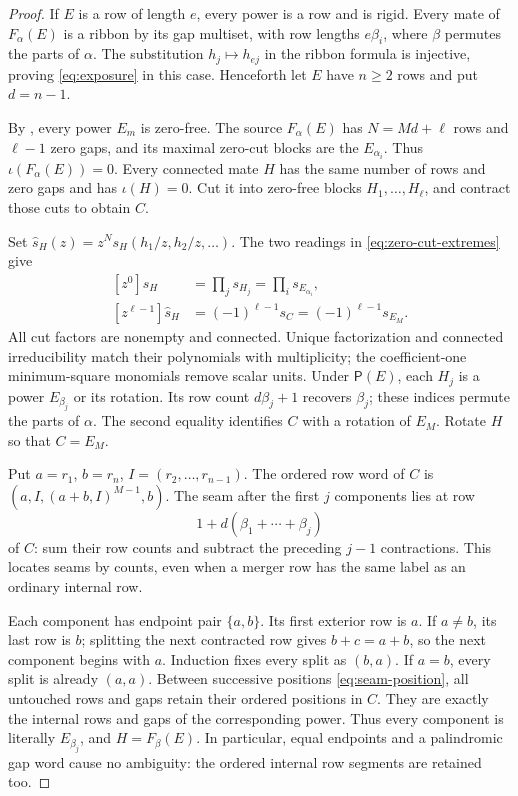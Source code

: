 \documentclass[11pt,a4paper]{amsart}
\numberwithin{equation}{section}
\theoremstyle{plain}
\theoremstyle{definition}
\begin{document}
\begin{proof}
If \(E\) is a row of length \(e\), every power is a row and is rigid.  Every mate of \(F_\alpha(E)\) is a ribbon by its gap multiset, with row lengths \(e\beta_i\), where \(\beta\) permutes the parts of \(\alpha\).  The substitution \(h_j\mapsto h_{ej}\) in the ribbon formula is injective, proving \eqref{eq:exposure} in this case.  Henceforth let \(E\) have \(n\ge2\) rows and put \(d=n-1\).

By , every power \(E_m\) is zero-free.  The source \(F_\alpha(E)\) has \(N=Md+\ell\) rows and \(\ell-1\) zero gaps, and its maximal zero-cut blocks are the \(E_{\alpha_i}\).  Thus \(\iota(F_\alpha(E))=0\).  Every connected mate \(H\) has the same number of rows and zero gaps and has \(\iota(H)=0\).  Cut it into zero-free blocks \(H_1,\ldots,H_\ell\), and contract those cuts to obtain \(C\).

Set \(\widehat s_H(z)=z^Ns_H(h_1/z,h_2/z,\ldots)\).  The two readings in \eqref{eq:zero-cut-extremes} give
\begin{equation}\label{eq:exposure-coefficients}
 \begin{aligned}
 [z^0]\widehat s_H&=\prod_j s_{H_j}=\prod_i s_{E_{\alpha_i}},\\
 [z^{\ell-1}]\widehat s_H&=(-1)^{\ell-1}s_C
                         =(-1)^{\ell-1}s_{E_M}.
 \end{aligned}
\end{equation}
All cut factors are nonempty and connected.  Unique factorization and connected irreducibility match their polynomials with multiplicity; the coefficient-one minimum-square monomials remove scalar units.  Under \(\mathsf P(E)\), each \(H_j\) is a power \(E_{\beta_j}\) or its rotation.  Its row count \(d\beta_j+1\) recovers \(\beta_j\); these indices permute the parts of \(\alpha\).  The second equality identifies \(C\) with a rotation of \(E_M\).  Rotate \(H\) so that \(C=E_M\).

Put \(a=r_1\), \(b=r_n\), \(I=(r_2,\ldots,r_{n-1})\).  The ordered row word of \(C\) is \((a,I,(a+b,I)^{M-1},b)\).  The seam after the first \(j\) components lies at row
\begin{equation}\label{eq:seam-position}
 1+d(\beta_1+\cdots+\beta_j)
\end{equation}
of \(C\): sum their row counts and subtract the preceding \(j-1\) contractions.  This locates seams by counts, even when a merger row has the same label as an ordinary internal row.

Each component has endpoint pair \(\{a,b\}\).  Its first exterior row is \(a\).  If \(a\ne b\), its last row is \(b\); splitting the next contracted row gives \(b+c=a+b\), so the next component begins with \(a\).  Induction fixes every split as \((b,a)\).  If \(a=b\), every split is already \((a,a)\).  Between successive positions \eqref{eq:seam-position}, all untouched rows and gaps retain their ordered positions in \(C\).  They are exactly the internal rows and gaps of the corresponding power.  Thus every component is literally \(E_{\beta_j}\), and \(H=F_\beta(E)\).  In particular, equal endpoints and a palindromic gap word cause no ambiguity: the ordered internal row segments are retained too.


\end{proof}
\end{document}
